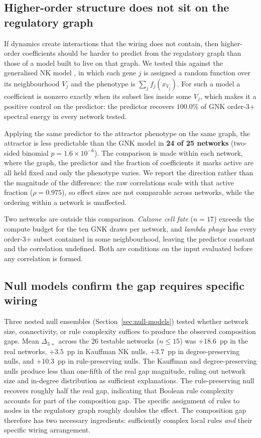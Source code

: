 \documentclass[10pt]{article}
\begin{document}
\subsection{Higher-order structure does not sit on the regulatory graph}
\label{sec:gnk}

If dynamics create interactions that the wiring does not contain, then
higher-order coefficients should be harder to predict from the
regulatory graph than those of a model built to live on that graph. We
tested this against the generalised NK model \citep{brookes2022sparsity},
in which each gene $j$ is assigned a random function over its
neighbourhood $V_j$ and the phenotype is $\sum_j f_j(x_{V_j})$. For such
a model a coefficient is nonzero exactly when its subset lies inside
some $V_j$, which makes it a positive control on the predictor: the
predictor recovers $100.0\%$ of GNK order-3+ spectral energy in every
network tested.

Applying the same predictor to the attractor phenotype on the same
graph, the attractor is less predictable than the GNK model in
\textbf{24 of 25 networks} (two-sided binomial $p = 1.6 \times
10^{-6}$). The comparison is made within each network, where the graph,
the predictor and the fraction of coefficients it marks active are all
held fixed and only the phenotype varies. We report the direction rather
than the magnitude of the difference: the raw correlations scale with
that active fraction ($\rho = 0.975$), so effect sizes are not
comparable across networks, while the ordering within a network is
unaffected.

Two networks are outside this comparison. \emph{Calzone cell fate}
($n = 17$) exceeds the compute budget for the ten GNK draws per network,
and \emph{lambda phage} has every order-3+ subset contained in some
neighbourhood, leaving the predictor constant and the correlation
undefined. Both are conditions on the input evaluated before any
correlation is formed.


\subsection{Null models confirm the gap requires specific wiring}
\label{sec:null-results}

Three nested null ensembles (Section~\ref{sec:null-models}) tested
whether network size, connectivity, or rule complexity suffices to
produce the observed composition gaps. Mean $\Delta_{3+}$ across the
26 testable networks ($n \leq 15$) was $+18.6$~pp in the real
networks, $+3.5$~pp in Kauffman NK nulls, $+3.7$~pp in
degree-preserving nulls, and $+10.3$~pp in rule-preserving nulls.
The Kauffman and degree-preserving nulls produce less than one-fifth
of the real gap magnitude, ruling out network size and in-degree
distribution as sufficient explanations. The rule-preserving null
recovers roughly half the real gap, indicating that Boolean rule
complexity accounts for part of the composition gap. The specific
assignment of rules to nodes in the regulatory graph roughly doubles
the effect. The composition gap therefore has two necessary
ingredients: sufficiently complex local rules \emph{and} their
specific wiring arrangement.
\end{document}
